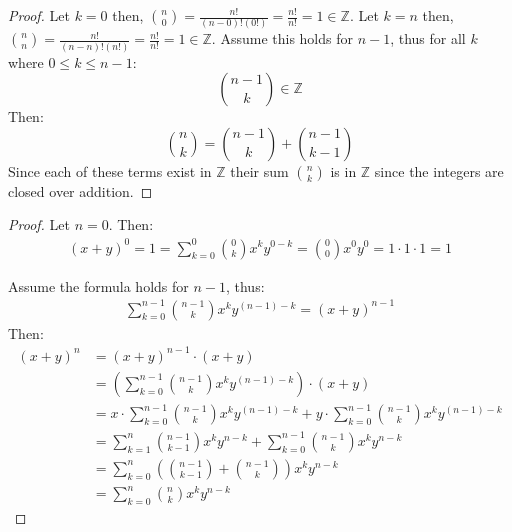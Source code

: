 \begin{proof}
    Let $k = 0$ then, $\binom{n}{0} = \frac{n!}{(n - 0)!(0!)} = \frac{n!}{n!} = 1 \in \mathbb{Z}$.
    Let $k = n$ then, $\binom{n}{n} = \frac{n!}{(n - n)!(n!)} = \frac{n!}{n!} = 1 \in \mathbb{Z}$.
    Assume this holds for $n - 1$, thus for all $k$ where $0 \le k \le n - 1$:
    \[\binom{n - 1}{k} \in \mathbb{Z}\]
    Then:
    \[\binom{n}{k} =  \binom{n - 1}{k} + \binom{n - 1}{k - 1}\]
    Since each of these terms exist in $\mathbb{Z}$ their sum $\binom{n}{k}$ is in
    $\mathbb{Z}$ since the integers are closed over addition.
\end{proof}

\begin{proof}
    Let $n = 0$. Then:
    \begin{align*}
        {(x + y)}^0 = 1 = \sum_{k = 0}^{0} \binom{0}{k} x^k y^{0-k} = \binom{0}{0} x^0 y^0 = 1 \cdot 1 \cdot 1 = 1
    \end{align*}

    Assume the formula holds for $n - 1$, thus:
    \begin{align*}
        \sum_{k = 0}^{n - 1} \binom{n - 1}{k} x^k y^{(n-1)-k} = (x+y)^{n - 1}
    \end{align*}
    Then:
    \begin{align*}
        {(x+y)}^n & = {(x+y)}^{n - 1} \cdot (x + y)                                                                                             \\
                  & = \left(\sum_{k = 0}^{n - 1} \binom{n - 1}{k} x^k y^{(n-1)-k}\right) \cdot (x + y)                                              \\
                  & = x \cdot \sum_{k = 0}^{n - 1} \binom{n - 1}{k} x^k y^{(n-1)-k} + y \cdot \sum_{k = 0}^{n - 1} \binom{n - 1}{k} x^k y^{(n-1)-k} \\
                  & = \sum_{k = 1}^{n} \binom{n - 1}{k - 1} x^k y^{n - k} + \sum_{k = 0}^{n - 1} \binom{n - 1}{k} x^k y^{n - k}                     \\
                  & = \sum_{k = 0}^{n} \left( \binom{n - 1}{k - 1} + \binom{n - 1}{k} \right) x^k y^{n - k}                                         \\
                  & = \sum_{k = 0}^{n} \binom{n}{k} x^k y^{n - k}
    \end{align*}
\end{proof}

